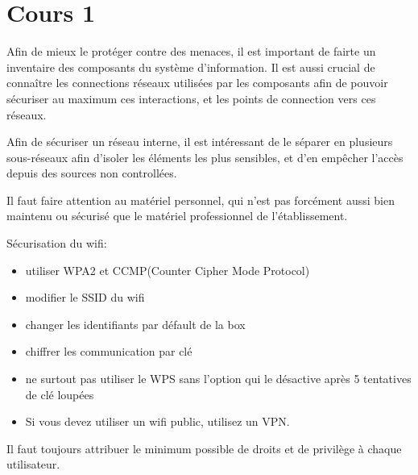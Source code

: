 \section{Cours 1}
Afin de mieux le protéger contre des menaces, il est important de fairte un inventaire des composants du système
d'information. Il est aussi crucial de connaître les connections réseaux utilisées par les composants afin de pouvoir
sécuriser au maximum ces interactions, et les points de connection vers ces réseaux.

Afin de sécuriser un réseau interne, il est intéressant de le séparer en plusieurs sous-réseaux afin d'isoler les
éléments les plus sensibles, et d'en empêcher l'accès depuis des sources non controllées.

Il faut faire attention au matériel personnel, qui n'est pas forcément aussi bien maintenu ou sécurisé que le matériel
professionnel de l'établissement.

Sécurisation du wifi:
\begin{itemize}
	\item utiliser WPA2 et CCMP(Counter Cipher Mode Protocol)
	\item modifier le SSID du wifi
	\item changer les identifiants par défault de la box
	\item chiffrer les communication par clé
	\item ne surtout pas utiliser le WPS sans l'option qui le désactive après 5 tentatives de clé loupées
	\item Si vous devez utiliser un wifi public, utilisez un VPN.
\end{itemize}

Il faut toujours attribuer le minimum possible de droits et de privilège à chaque utilisateur.

